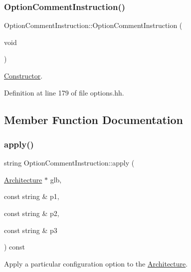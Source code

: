 \subsubsection{\texorpdfstring{OptionCommentInstruction()}{OptionCommentInstruction()}}
{\footnotesize\ttfamily Option\+Comment\+Instruction\+::\+Option\+Comment\+Instruction (\begin{DoxyParamCaption}\item[{void}]{ }\end{DoxyParamCaption})\hspace{0.3cm}{\ttfamily [inline]}}



\mbox{\hyperlink{class_constructor}{Constructor}}. 



Definition at line 179 of file options.\+hh.



\subsection{Member Function Documentation}
\mbox{\label{class_option_comment_instruction_afb67ac6097c2043acb256fd1d6935d95}} 
\subsubsection{\texorpdfstring{apply()}{apply()}}
{\footnotesize\ttfamily string Option\+Comment\+Instruction\+::apply (\begin{DoxyParamCaption}\item[{\mbox{\hyperlink{class_architecture}{Architecture}} $\ast$}]{glb,  }\item[{const string \&}]{p1,  }\item[{const string \&}]{p2,  }\item[{const string \&}]{p3 }\end{DoxyParamCaption}) const\hspace{0.3cm}{\ttfamily [virtual]}}



Apply a particular configuration option to the \mbox{\hyperlink{class_architecture}{Architecture}}. 

